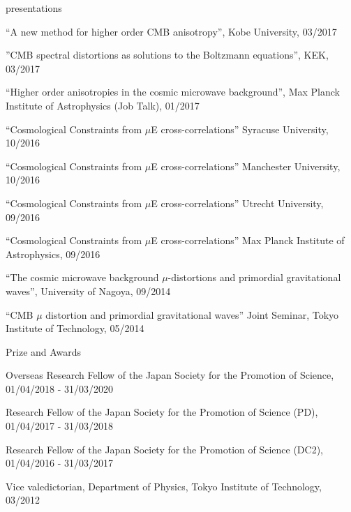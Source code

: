 \documentclass[a4paper]{resume} %
\begin{document}
\begin{rSection}{presentations}
\begin{etaremune}
    \item
    ``A new method for higher order CMB anisotropy'', Kobe University, 03/2017  

    \item
    ''CMB spectral distortions as solutions to the Boltzmann equations'', KEK, 03/2017  

    \item
    ``Higher order anisotropies in the cosmic microwave background'', Max Planck Institute of Astrophysics (Job Talk), 01/2017

    \item
    ``Cosmological Constraints from $\mu$E cross-correlations'' Syracuse University, 10/2016

    \item
    ``Cosmological Constraints from $\mu$E cross-correlations'' Manchester University, 10/2016 

    \item
    ``Cosmological Constraints from $\mu$E cross-correlations'' Utrecht University, 09/2016 

    \item
``Cosmological Constraints from $\mu$E cross-correlations'' Max Planck Institute of Astrophysics, 09/2016 

    \item
``The cosmic microwave background $\mu$-distortions and primordial gravitational waves'', University of Nagoya, 09/2014 

    \item 
    ``CMB $\mu$ distortion and primordial gravitational waves'' Joint Seminar, Tokyo Institute of Technology, 05/2014
\end{etaremune}

\end{rSection}


\begin{rSection}{Prize and Awards}
	\begin{etaremune}

\item Overseas Research Fellow of the Japan Society for the Promotion of Science, 01/04/2018 - 31/03/2020

    \item Research Fellow of the Japan Society for the Promotion of Science (PD), 01/04/2017 - 31/03/2018

    \item Research Fellow of the Japan Society for the Promotion of Science (DC2), 01/04/2016 - 31/03/2017

    \item
Vice valedictorian, Department of Physics, Tokyo Institute of Technology, 03/2012
    
\end{etaremune}
\end{rSection}
\end{document}
